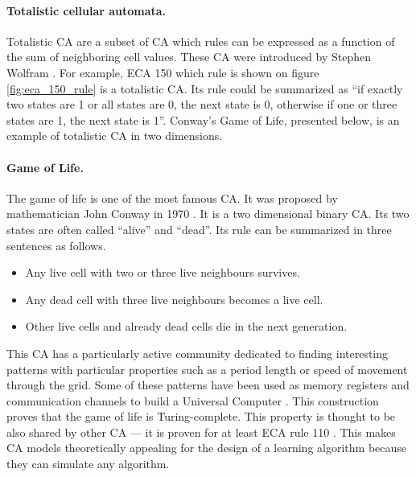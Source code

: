 \paragraph{Totalistic cellular automata.}
Totalistic \ac{CA} are a subset of \ac{CA} which rules can be expressed as a
function of the sum of neighboring cell values. These \ac{CA} were introduced by
Stephen Wolfram \parencite{wolframStatisticalMechanicsCellular1983}. For
example, \ac{ECA} 150 which rule is shown on figure \ref{fig:eca_150_rule} is a
totalistic \ac{CA}. Its rule could be summarized as ``if exactly two states are
1 or all states are 0, the next state is 0, otherwise if one or three states are
1, the next state is 1''. Conway's Game of Life, presented below, is an example
of totalistic \ac{CA} in two dimensions.

\paragraph{Game of Life.\label{sec:game-life}}
The game of life is one of the most famous \ac{CA}. It was proposed by
mathematician John Conway in 1970 \parencite{gardnerMathematicalGames1970}. It
is a two dimensional binary \ac{CA}. Its two states are often called ``alive''
and ``dead''. Its rule can be summarized in three sentences as follows.
\begin{itemize}
  \item Any live cell with two or three live neighbours survives.
  \item Any dead cell with three live neighbours becomes a live cell.
  \item Other live cells and already dead cells die in the next generation.
\end{itemize}
This \ac{CA} has a particularly active community dedicated to finding
interesting patterns with particular properties such as a period length or speed
of movement through the grid. Some of these patterns have been used as memory
registers and communication channels to build a Universal Computer
\parencite{IgblanLifeUniversal}. This construction proves that the game of life
is Turing-complete. This property is thought to be also shared by other \ac{CA}
--- it is proven for at least \ac{ECA} rule 110
\parencite{cookUniversalityElementaryCellular2004}. This makes \ac{CA} models
theoretically appealing for the design of a learning algorithm because they can
simulate any algorithm.

